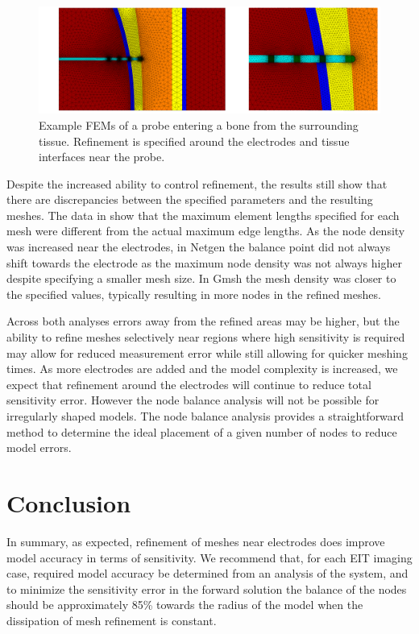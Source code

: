 \begin{figure}
  \includegraphics[width=\columnwidth]{chapter4-mesh_refinement/imgs/advanced_mesh_combined.pdf}
    \caption[Advanced mesh example of an internal probe]{\label{fig:adv_mesh} Example FEMs of a probe entering a bone from the surrounding 
    tissue. Refinement is specified around the electrodes and tissue interfaces near the probe.}
\end{figure}

Despite the increased ability to control refinement, the results still show that there are
discrepancies between the specified parameters and the resulting meshes. The data in 
 show that the maximum element lengths specified for each mesh 
were different from the actual maximum edge lengths. As the node density was increased
near the electrodes, in Netgen the balance point did not always shift towards the electrode
as the maximum node density was not always higher despite specifying a smaller mesh size.
In Gmsh the mesh density was closer to the specified values, typically resulting in more
nodes in the refined meshes. 

Across both analyses errors away from the refined areas may be higher,
but the ability to refine meshes selectively near regions where high sensitivity 
is required may allow for reduced measurement error while still allowing for quicker 
meshing times.
As more electrodes are added and the model complexity is increased, we expect that 
refinement around the electrodes will continue to reduce total sensitivity error. However 
the node balance analysis will not be possible for irregularly shaped models.
The node balance analysis provides a straightforward method to determine the 
ideal placement of a given number of nodes to reduce model errors.



\section{Conclusion}

In summary, as expected, refinement of  meshes near electrodes 
does improve model accuracy in terms of sensitivity.
We recommend that, for each EIT imaging case, required model accuracy be
determined from an analysis of the system, 
and to minimize the sensitivity error in the forward solution 
the balance of the nodes should be approximately 
85\% towards the radius of the
model when the dissipation of mesh refinement is constant. 